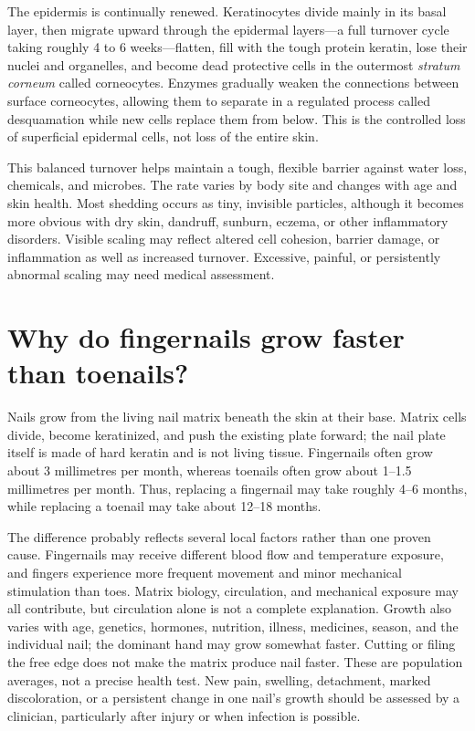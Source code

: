 \documentclass[11pt,oneside]{report}
\begin{document}
The epidermis is continually renewed. Keratinocytes divide mainly in its basal
layer, then migrate upward through the epidermal layers—a full turnover cycle
taking roughly 4 to 6 weeks—flatten, fill with the tough protein keratin, lose
their nuclei and organelles, and become dead protective cells in the outermost
\emph{stratum corneum} called corneocytes. Enzymes gradually weaken the connections between surface
corneocytes, allowing them to separate in a regulated process called
desquamation while new cells replace them from below. This is the controlled
loss of superficial epidermal cells, not loss of the entire skin.

This balanced turnover helps maintain a tough, flexible barrier against water
loss, chemicals, and microbes. The rate varies by body site and changes with
age and skin health. Most shedding occurs as tiny, invisible particles,
although it becomes more obvious with dry skin, dandruff, sunburn, eczema, or
other inflammatory disorders. Visible scaling may reflect altered cell cohesion,
barrier damage, or inflammation as well as increased turnover. Excessive,
painful, or persistently abnormal scaling may need medical assessment.

\section{Why do fingernails grow faster than toenails?}

Nails grow from the living nail matrix beneath the skin at their base. Matrix
cells divide, become keratinized, and push the existing plate forward; the nail
plate itself is made of hard keratin and is not living tissue. Fingernails often
grow about 3 millimetres per month, whereas toenails often grow about
1--1.5 millimetres per month. Thus, replacing a fingernail may take roughly
4--6 months, while replacing a toenail may take about 12--18 months.

The difference probably reflects several local factors rather than one proven
cause. Fingernails may receive different blood flow and temperature exposure,
and fingers experience more frequent movement and minor mechanical stimulation
than toes. Matrix biology, circulation, and mechanical exposure may all
contribute, but circulation alone is not a complete explanation. Growth also
varies with age, genetics, hormones, nutrition, illness, medicines, season, and
the individual nail; the dominant hand may grow somewhat faster. Cutting or
filing the free edge does not make the matrix produce nail faster. These are
population averages, not a precise health test. New pain, swelling,
detachment, marked discoloration, or a persistent change in one nail's growth
should be assessed by a clinician, particularly after injury or when infection
is possible.
\end{document}
